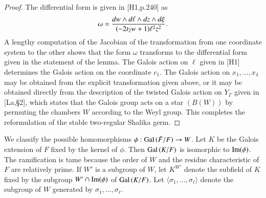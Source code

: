 \documentclass{amsart}
\newcommand\Gal{\hbox{Gal\,}}
\newcommand\Ima{\hbox{Im}}
\newcommand\bF{{\bar F}}
\begin{document}
\begin{proof}
The differential form is given in [H1,p.240] as
$$\omega = {dw\wedge d\ell\wedge dz\wedge d\xi\over
 (-2t_2 w + 1) \ell^2 z^2}.$$
A lengthy computation of the Jacobian of the transformation
from one coordinate system to the other shows that the form $\omega$
transforms to the differential form given in the statement of the lemma.
The Galois action on $\ell$ given in [H1] determines the Galois action
on the coordinate $c_1$.  The Galois action on $x_1,\ldots,x_4$ may
be obtained from the explicit transformation given above, or it may
be obtained directly from the description of the twisted Galois action
on $Y_\Gamma$ given in [La,\S2], 
which states that the Galois group acts on a 
star $(B(W))$ by permuting the chambers $W$ according to the Weyl group.
This completes the reformulation of the
stable two-regular Shalika germ.\end{proof}

\bigskip
We classify the possible homomorphisms $\phi:\Gal(\bF/F)\to W$.
Let $K$
be the Galois extension of $F$ fixed by the kernel of $\phi$.
Then $\Gal(K/F)$ is isomorphic to $\Ima(\phi)$.
The ramification is tame because the order of $W$ and the
residue characteristic of $F$ are relatively prime.  
  If $W'$
is a subgroup of $W$, let $K^{W'}$ denote the subfield of $K$
fixed by the subgroup 
$W'\cap \Ima(\phi)$ of $\Gal(K/F)$.  Let $\langle\sigma_1,\ldots,\sigma_\ell\rangle
$ denote the subgroup of $W$ generated by $\sigma_1,\ldots,\sigma_\ell$.
\end{document}
